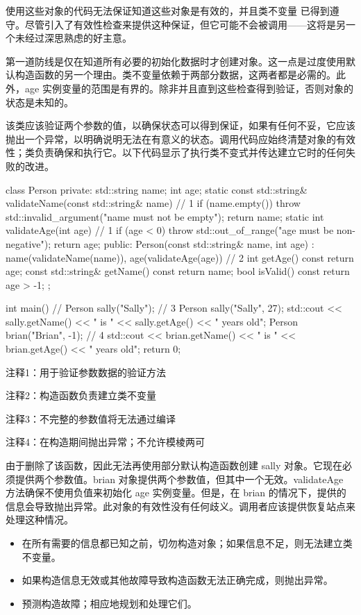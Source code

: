 
使用这些对象的代码无法保证知道这些对象是有效的，并且类不变量 已得到遵守。尽管引入了有效性检查来提供这种保证，但它可能不会被调用——这将是另一个未经过深思熟虑的好主意。


第一道防线是仅在知道所有必要的初始化数据时才创建对象。这一点是过度使用默认构造函数的另一个理由。类不变量依赖于两部分数据，这两者都是必需的。此外，age 实例变量的范围是有界的。除非并且直到这些检查得到验证，否则对象的状态是未知的。

该类应该验证两个参数的值，以确保状态可以得到保证，如果有任何不妥，它应该抛出一个异常，以明确说明无法在有意义的状态。调用代码应始终清楚对象的有效性；类负责确保和执行它。以下代码显示了执行类不变式并传达建立它时的任何失败的改进。


\begin{cpp}
class Person {
private:
  std::string name;
  int age;
  static const std::string& validateName(const std::string& name) { // 1
    if (name.empty())
      throw std::invalid_argument("name must not be empty");
    return name;
  }
  static int validateAge(int age) { // 1
    if (age < 0)
      throw std::out_of_range("age must be non-negative");
    return age;
  }
public:
  Person(const std::string& name, int age) :
    name(validateName(name)), age(validateAge(age)) {} // 2
  int getAge() const { return age; }
  const std::string& getName() const { return name; }
  bool isValid() const { return age > -1; }
};

int main() {
  // Person sally("Sally"); // 3
  Person sally("Sally", 27);
  std::cout << sally.getName() << " is " << sally.getAge()
    << " years old\n";
  Person brian("Brian", -1); // 4
  std::cout << brian.getName() << " is " << brian.getAge()
    << " years old\n";
  return 0;
}
\end{cpp}

{\footnotesize
注释1：用于验证参数数据的验证方法

注释2：构造函数负责建立类不变量

注释3：不完整的参数值将无法通过编译

注释4：在构造期间抛出异常；不允许模棱两可
}

由于删除了该函数，因此无法再使用部分默认构造函数创建 sally 对象。它现在必须提供两个参数值。brian 对象提供两个参数值，但其中一个无效。validateAge 方法确保不使用负值来初始化 age 实例变量。但是，在 brian 的情况下，提供的信息会导致抛出异常。此对象的有效性没有任何歧义。调用者应该提供恢复站点来处理这种情况。


\begin{itemize}
\item
在所有需要的信息都已知之前，切勿构造对象；如果信息不足，则无法建立类不变量。

\item
如果构造信息无效或其他故障导致构造函数无法正确完成，则抛出异常。

\item
预测构造故障；相应地规划和处理它们。
\end{itemize}








